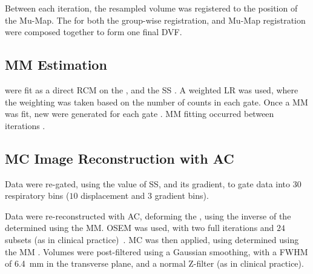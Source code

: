         Between each iteration, the resampled volume was registered to the position of the \gls{Mu-Map}. The  for both the group-wise registration, and \gls{Mu-Map} registration were composed together to form one final \gls{DVF}.%
    
    
    \subsection{\acrlong{MM} Estimation} \label{sec:motion_model_estimation}
         were fit as a direct \acrlong{RCM} on the , %
        and the \gls{SS}%
        . A weighted \acrlong{LR} was used, where the weighting was taken based on the number of counts in each gate. Once a \gls{MM} was fit, new  were generated for each gate%
        . \gls{MM} fitting occurred between iterations%
        .
    
    
    \subsection{\gls{MC} Image Reconstruction with \gls{AC}} \label{sec:mc_image_reconstruction_with_ac}
        Data were re-gated, using the value of \gls{SS}, and its gradient, to gate data into $30$ respiratory bins ($10$ displacement and $3$ gradient bins).
        
        Data were re-reconstructed with \gls{AC}, deforming the , using the inverse of the  determined using the \gls{MM}. %
        \acrshort{OSEM} was used, with two full iterations and $24$ subsets (as in clinical practice)~\cite{Hudson1994}. \gls{MC} was then applied, using  determined using the \gls{MM}%
        . Volumes were post-filtered using a Gaussian smoothing, with a \acrshort{FWHM} of \SI{6.4}{\milli\metre} in the transverse plane, and a normal Z-filter (as in clinical practice).
    
